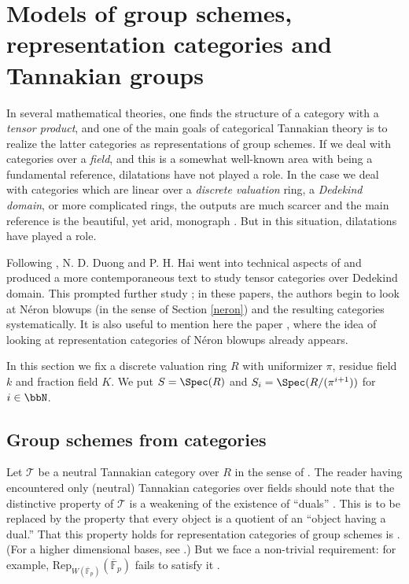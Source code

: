 \documentclass[10pt]{alggeom}
\theoremstyle{definition}
\numberwithin{equation}{section}
\begin{document}
\section{Models of group schemes, representation categories and Tannakian groups}\label{Tannak}
 
 
 
 
In several  mathematical theories, one finds the structure of a category with a {\it tensor product}, and one of the main goals of categorical Tannakian theory is to realize the latter categories  as representations of group schemes. If we deal with categories over a {\it field},  and this is a somewhat  well-known area  with \cite{deligne-milne82} being a fundamental reference,  dilatations have not played a role. In the case we deal with categories which are linear over a {\it discrete valuation} ring, a {\it Dedekind domain}, or  more complicated rings, the outputs are much  scarcer and the main reference is the beautiful, yet  arid, monograph \cite{saavedra72}. But in this situation,  dilatations have played a role. 

Following    \cite{dos_santos09}, N. D. Duong  and P. H. Hai \cite{duong-hai18} went into technical aspects of \cite{saavedra72} and produced  a more contemporaneous text to study tensor categories over Dedekind domain. This prompted further study        \cite{duong-hai-dos_santos18,hai-dos_santos21}; in these papers, the authors begin to look at N\'eron blowups (in the sense of Section \ref{neron}) and the resulting categories systematically. It is also useful to mention here the paper  \cite{csima-kottwitz10}, where the idea of looking at representation categories of  N\'eron blowups already appears.

  In this section we fix a discrete valuation ring $R$ with uniformizer $\pi$, residue field $k$ and fraction field $K$. We put $S= \Spec (R)$ and $S_i = \Spec ( R/(\pi ^{i+1}))$ for $i \in \bbN$. 


\subsection{Group schemes from categories}\label{Tannak1}
 
Let $\mathcal T$ be a neutral Tannakian category over $R$ in the sense of \cite[Definition 1.2.5]{duong-hai18}. The reader having encountered only (neutral) Tannakian categories over fields \cite[Section 2]{deligne-milne82}  should note that the distinctive property of $\mathcal T$ is a weakening of the existence of  ``duals'' \cite[Definition 1.7]{deligne-milne82}. This is    to be replaced by the  property that every object is a quotient of an ``object having a dual.''  That this property holds for representation categories of group schemes is   \cite[Proposition 3]{serre68}. (For a higher dimensional bases, see \cite[Lema 2.5]{thomason87}.)
But we face a  non-trivial requirement: for example, $\mathrm{Rep}_{W(\overline{\mathbb F}_p)}(\overline{\mathbb F}_p)$ fails to satisfy it \cite[Example 4.7]{hai-dos_santos21}. 
\end{document}
